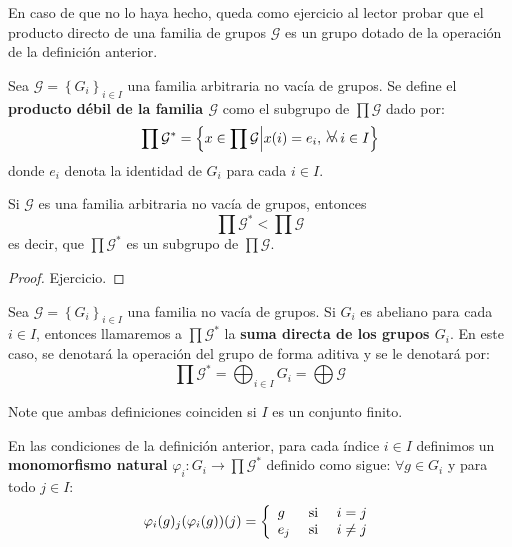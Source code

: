 \documentclass[12pt]{report}
\newcounter{it}
\theoremstyle{largebreak}
\newcommand\cf[3]{\ensuremath{#1:#2\rightarrow#3}}
\newcommand{\afa}{\:
    \begin{tikzpicture}
        \draw [line width = 0.17 mm, black] (0,0) -- (-0.115,0.29);
        \draw [line width = 0.17 mm, black] (0,0) -- (0.115,0.29);
        \draw [line width = 0.17 mm, black] (-0.12,0) arc (190:-10:0.12cm);
    \end{tikzpicture}
    \:
}
\begin{document}
    En caso de que no lo haya hecho, queda como ejercicio al lector probar que el producto directo de una familia de grupos $\mathcal{G}$ es un grupo dotado de la operación de la definición anterior.

    \begin{mydef}
        Sea $\mathcal{G}=\left\{G_i \right\}_{ i\in I}$ una familia arbitraria no vacía de grupos. Se define el \textbf{producto débil de la familia $\mathcal{G}$} como el subgrupo de $\prod\mathcal{G}$ dado por:
        \begin{equation*}
            \prod\mathcal{G}^*=\left\{x\in\prod\mathcal{G}\Big|x(i)=e_i,\afa i\in I \right\}
        \end{equation*}
        donde $e_i$ denota la identidad de $G_i$ para cada $i\in I$.
    \end{mydef}

    \begin{propo}
        Si $\mathcal{G}$ es una familia arbitraria no vacía de grupos, entonces
        \begin{equation*}
            \prod\mathcal{G}^*<\prod\mathcal{G}
        \end{equation*}
        es decir, que $\prod\mathcal{G}^*$ es un subgrupo de $\prod\mathcal{G}$.
    \end{propo}

    \begin{proof}
        Ejercicio.
    \end{proof}

    \begin{mydef}
        Sea $\mathcal{G}=\left\{G_i \right\}_{ i\in I}$ una familia no vacía de grupos. Si $G_i$ es abeliano para cada $i\in I$, entonces llamaremos a $\prod\mathcal{G}^*$ la \textbf{suma directa de los grupos $G_i$}. En este caso, se denotará la operación del grupo de forma aditiva y se le denotará por:
        \begin{equation*}
            \prod\mathcal{G}^*=\bigoplus_{ i\in I}G_i=\bigoplus\mathcal{G}
        \end{equation*}
    \end{mydef}

    \begin{obs}
        Note que ambas definiciones coinciden si $I$ es un conjunto finito.
    \end{obs}

    \begin{mydef}
        En las condiciones de la definición anterior, para cada índice $i\in I$ definimos un \textbf{monomorfismo natural} $\cf{\varphi_i}{G_i}{\prod\mathcal{G}^*}$ definido como sigue: $\forall g\in G_i$ y para todo $j\in I$:
        \begin{equation*}
            \varphi_i(g)_j(\varphi_i(g))(j)=\left\{
                \begin{array}{lcr}
                    g & \textup{ si } & i = j\\
                    e_j & \textup{ si } & i\neq j\\
                \end{array}
            \right.
        \end{equation*}
    \end{mydef}
\end{document}
